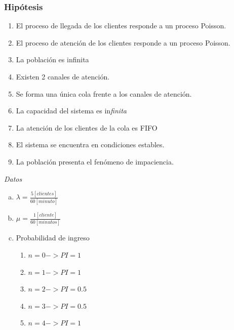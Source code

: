 \documentclass[a4paper,11pt]{article}
\begin{document}
\vspace{21pt}
\subsubsection*{Hipótesis}

\leftskip=36pt
\parindent=-18pt
\begin{enumerate}[1.]
  \item El proceso de llegada de los clientes responde a un proceso Poisson.
  \item El proceso de atención de los clientes responde a un proceso Poisson.
  \item La población es infinita
  \item Existen 2 canales de atención.
  \item Se forma una única cola frente a los canales de atención.
  \item La capacidad del sistema es in\textit{finita}
  \item La atención de los clientes de la cola es FIFO
  \item El sistema se encuentra en condiciones estables.
  \item La población presenta el fenómeno de impaciencia.
\end{enumerate}

\vspace{13pt}
\leftskip=0pt
\parindent=0pt
\textit{Datos}

\leftskip=36pt
\parindent=-18pt
\begin{enumerate}[a)]
  \item
    $\lambda = \frac{5[clientes]}{60[minuto]}$

  \item
    $\mu = \frac{1[cliente]}{60[minutos]}$

  \item Probabilidad de ingreso

    \leftskip=72pt
    \begin{enumerate}[1)]
      \item $n = 0 -> PI = 1$
      \item $n = 1 -> PI = 1$
      \item $n = 2 -> PI = 0.5$
      \item $n = 3 -> PI = 0.5$
      \item $n = 4 -> PI = 1$
    \end{enumerate}
\end{enumerate}
\end{document}
